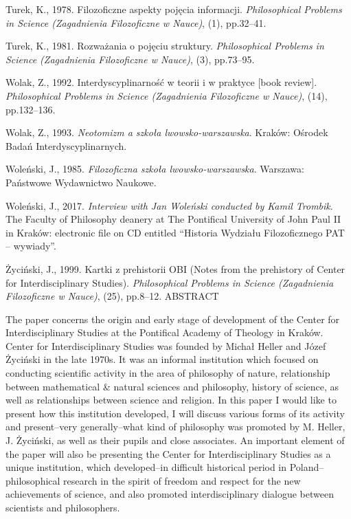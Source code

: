 \documentclass[a4paper]{article}
\begin{document}
Turek, K., 1978. Filozoficzne aspekty pojęcia informacji. \textit{Philosophical Problems in Science (Zagadnienia
Filozoficzne w Nauce)}, (1), pp.32–41.

Turek, K., 1981. Rozważania o pojęciu struktury. \textit{Philosophical Problems in Science (Zagadnienia Filozoficzne w
Nauce)}, (3), pp.73–95.

Wolak, Z., 1992. Interdyscyplinarność w teorii i w praktyce [book review]. \textit{Philosophical Problems in Science
(Zagadnienia Filozoficzne w Nauce)}, (14), pp.132–136.

Wolak, Z., 1993. \textit{Neotomizm a szkoła lwowsko-warszawska}. Kraków: Ośrodek Badań Interdyscyplinarnych.

Woleński, J., 1985. \textit{Filozoficzna szkoła lwowsko-warszawska}. Warszawa: Państwowe Wydawnictwo Naukowe.

Woleński, J., 2017. \textit{Interview with Jan Woleński conducted by Kamil Trombik}. The Faculty of Philosophy deanery
at The Pontifical University of John Paul II in Kraków: electronic file on CD entitled “Historia Wydziału
Filozoficznego PAT – wywiady”.

Życiński, J., 1999. Kartki z prehistorii OBI (Notes from the prehistory of Center for Interdisciplinary Studies).
\textit{Philosophical Problems in Science (Zagadnienia Filozoficzne w Nauce)}, (25), pp.8–12.
ABSTRACT

The paper concerns the origin and early stage of development of the Center for Interdisciplinary Studies at the
Pontifical Academy of Theology in Kraków. Center for Interdisciplinary Studies was founded by Michał Heller and Józef
Życiński in the late 1970s. It was an informal institution which focused on conducting scientific activity in the area
of philosophy of nature, relationship between mathematical \& natural sciences and philosophy, history of science, as
well as relationships between science and religion. In this paper I would like to present how this institution
developed, I will discuss various forms of its activity and present–very generally–what kind of philosophy was promoted
by M. Heller, J. Życiński, as well as their pupils and close associates. An important element of the paper will also be
presenting the Center for Interdisciplinary Studies as a unique institution, which developed–in difficult historical
period in Poland–philosophical research in the spirit of freedom and respect for the new achievements of science, and
also promoted interdisciplinary dialogue between scientists and philosophers.
\end{document}
